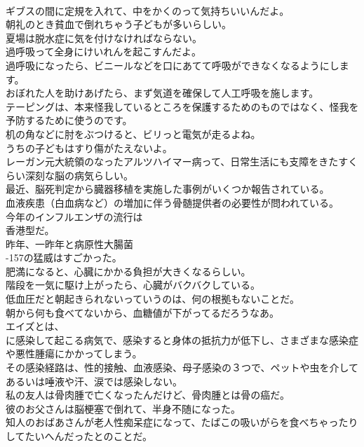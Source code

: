 \documentclass[8pt]{extreport}
\begin{document}
\begin{CJK}{UTF8}{min}
\\	ギブスの間に定規を入れて、中をかくのって気持ちいいんだよ。	
\\	朝礼のとき貧血で倒れちゃう子どもが多いらしい。	
\\	夏場は脱水症に気を付けなければならない。	
\\	過呼吸って全身にけいれんを起こすんだよ。	
\\	過呼吸になったら、ビニールなどを口にあてて呼吸ができなくなるようにします。	
\\	おぼれた人を助けあげたら、まず気道を確保して人工呼吸を施します。	
\\	テーピングは、本来怪我しているところを保護するためのものではなく、怪我を予防するために使うのです。	
\\	机の角などに肘をぶつけると、ビリっと電気が走るよね。	
\\	うちの子どもはすり傷がたえないよ。	
\\	レーガン元大統領のなったアルツハイマー病って、日常生活にも支障をきたすくらい深刻な脳の病気らしい。	
\\	最近、脳死判定から臓器移植を実施した事例がいくつか報告されている。	
\\	血液疾患（白血病など）の増加に伴う骨髄提供者の必要性が問われている。	
\\	今年のインフルエンザの流行は
\\	香港型だ。	
\\	昨年、一昨年と病原性大腸菌
\\	-157の猛威はすごかった。	
\\	肥満になると、心臓にかかる負担が大きくなるらしい。	
\\	階段を一気に駆け上がったら、心臓がバクバクしている。	
\\	低血圧だと朝起きられないっていうのは、何の根拠もないことだ。	
\\	朝から何も食べてないから、血糖値が下がってるだろうなあ。	
\\	エイズとは、
\\	に感染して起こる病気で、感染すると身体の抵抗力が低下し、さまざまな感染症や悪性腫瘍にかかってしまう。	
\\	その感染経路は、性的接触、血液感染、母子感染の３つで、ペットや虫を介してあるいは唾液や汗、涙では感染しない。	
\\	私の友人は骨肉腫で亡くなったんだけど、骨肉腫とは骨の癌だ。	
\\	彼のお父さんは脳梗塞で倒れて、半身不随になった。	
\\	知人のおばあさんが老人性痴呆症になって、たばこの吸いがらを食べちゃったりしてたいへんだったとのことだ。	

\end{CJK}
\end{document}
